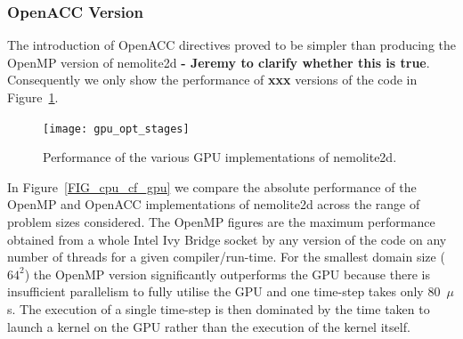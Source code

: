 \documentclass[journal]{IEEEtran}
\newcommand{\psykal}{{PS}y{KA}l\ }
\begin{document}


\subsubsection{OpenACC Version}

The introduction of OpenACC directives proved to be simpler than
producing the OpenMP version of nemolite2d {\bf - Jeremy to clarify
  whether this is true}.  Consequently we only show the performance of
{\bf xxx} versions of the code in Figure~\ref{FIG_gpu_opt_stages}.

\begin{figure}
\centering
\texttt{[image: gpu\_opt\_stages]}
\caption{Performance of the various GPU implementations of nemolite2d.}
\label{FIG_gpu_opt_stages}
\end{figure}

In Figure~\ref{FIG_cpu_cf_gpu} we compare the absolute performance of
the OpenMP and OpenACC implementations of nemolite2d across the range
of problem sizes considered. The OpenMP figures are the maximum
performance obtained from a whole Intel Ivy Bridge socket by any
version of the code on any number of threads for a given
compiler/run-time. For the smallest domain size ($64^2$) the OpenMP
version significantly outperforms the GPU because there is
insufficient parallelism to fully utilise the GPU and one time-step
takes only 80~$\mu$s. The execution of a single time-step is then
dominated by the time taken to launch a kernel on the GPU rather than
the execution of the kernel itself.
\end{document}
